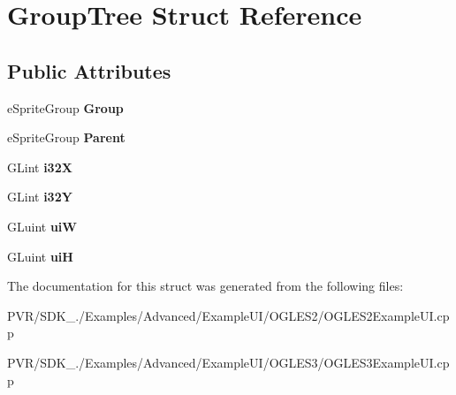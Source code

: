 \hypertarget{struct_group_tree}{\section{Group\+Tree Struct Reference}
\label{struct_group_tree}
}
\subsection*{Public Attributes}
\begin{DoxyCompactItemize}
\item 
\hypertarget{struct_group_tree_a42dfd42b12fefa27c0858a943eae762e}{e\+Sprite\+Group {\bfseries Group}}\label{struct_group_tree_a42dfd42b12fefa27c0858a943eae762e}

\item 
\hypertarget{struct_group_tree_a8443c066eeaec1b47113c0ac779473c4}{e\+Sprite\+Group {\bfseries Parent}}\label{struct_group_tree_a8443c066eeaec1b47113c0ac779473c4}

\item 
\hypertarget{struct_group_tree_afa9164059a309e9d2f2cdec68b2b320d}{G\+Lint {\bfseries i32\+X}}\label{struct_group_tree_afa9164059a309e9d2f2cdec68b2b320d}

\item 
\hypertarget{struct_group_tree_ac78a582207f0780320d26df508c08ba0}{G\+Lint {\bfseries i32\+Y}}\label{struct_group_tree_ac78a582207f0780320d26df508c08ba0}

\item 
\hypertarget{struct_group_tree_af981646787ffe43b86a6ee004d10b27c}{G\+Luint {\bfseries ui\+W}}\label{struct_group_tree_af981646787ffe43b86a6ee004d10b27c}

\item 
\hypertarget{struct_group_tree_a634293e770f52325963f14c9590c863f}{G\+Luint {\bfseries ui\+H}}\label{struct_group_tree_a634293e770f52325963f14c9590c863f}

\end{DoxyCompactItemize}


The documentation for this struct was generated from the following files\+:\begin{DoxyCompactItemize}
\item 
P\+V\+R/\+S\+D\+K\+\_./\+Examples/\+Advanced/\+Example\+U\+I/\+O\+G\+L\+E\+S2/O\+G\+L\+E\+S2\+Example\+U\+I.\+cpp\item 
P\+V\+R/\+S\+D\+K\+\_./\+Examples/\+Advanced/\+Example\+U\+I/\+O\+G\+L\+E\+S3/O\+G\+L\+E\+S3\+Example\+U\+I.\+cpp\end{DoxyCompactItemize}
